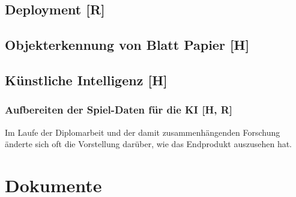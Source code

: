 \subsection{Deployment [R]}



\subsection{Objekterkennung von Blatt Papier [H]}
\subsection{Künstliche Intelligenz [H]}
\subsubsection{Aufbereiten der Spiel-Daten für die KI [H, R]}
Im Laufe der Diplomarbeit und der damit zusammenhängenden Forschung änderte sich oft die
Vorstellung darüber, wie das Endprodukt auszusehen hat.


\section{Dokumente}
